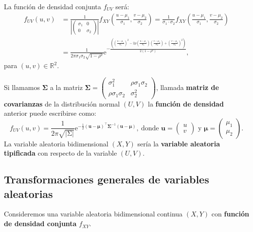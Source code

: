 \documentclass[]{book}
\begin{document}
La función de densidad conjunta \(f_{UV}\) será:
\[
\begin{array}{rl}
f_{UV}(u,v) & = \frac{1}{\left|\begin{pmatrix}\sigma_1 & 0\\ 0& \sigma_2\end{pmatrix}\right|} f_{XY}\left(\frac{u-\mu_1}{\sigma_1},\frac{v-\mu_2}{\sigma_2}\right)
=\frac{1}{\sigma_1\cdot \sigma_2}f_{XY}\left(\frac{u-\mu_1}{\sigma_1},\frac{v-\mu_2}{\sigma_2}\right)\\ & =
\frac{1}{2\pi\sigma_1\sigma_2\sqrt{1-\rho^2}}\mathrm{e}^{-\frac{\left(\left(\frac{u-\mu_1}{\sigma_1}\right)^2-2\rho \left(\frac{u-\mu_1}{\sigma_1}\right)\left(\frac{v-\mu_2}{\sigma_2}\right)+\left(\frac{v-\mu_2}{\sigma_2}\right)^2\right)}{2(1-\rho^2)}},
\end{array}
\]
para \((u,v)\in\mathbb{R}^2\).

Si llamamos \(\mathbf{\Sigma}\) a la matriz \(\mathbf{\Sigma}=\begin{pmatrix}\sigma_1^2 & \rho\sigma_1\sigma_2\\ \rho\sigma_1\sigma_2 & \sigma_2^2\end{pmatrix}\), llamada \textbf{matriz de covarianzas} de la distribución normal \((U,V)\) la \textbf{función de densidad} anterior puede escribirse como:
\[
f_{UV}(u,v)=\frac{1}{2\pi \sqrt{\left|\mathrm{\Sigma}\right|}}\mathrm{e}^{-\frac{1}{2}(\mathbf{u}-\mathbf{\mu})^\top \mathbf{\Sigma}^{-1}(\mathbf{u}-\mathbf{\mu})},\ \mbox{donde $\mathbf{u}=\begin{pmatrix}u \\ v\end{pmatrix}$ y $\mathbf{\mu}=\begin{pmatrix}\mu_1\\\mu_2\end{pmatrix}$.}
\]
La variable aleatoria bidimensional \((X,Y)\) sería la \textbf{variable aleatoria tipificada} con respecto de la variable \((U,V)\).

\hypertarget{transformaciones-generales-de-variables-aleatorias}{%
\subsection{Transformaciones generales de variables aleatorias}\label{transformaciones-generales-de-variables-aleatorias}}

Consideremos una variable aleatoria bidimensional continua \((X,Y)\) con \textbf{función de densidad conjunta} \(f_{XY}\).
\end{document}
